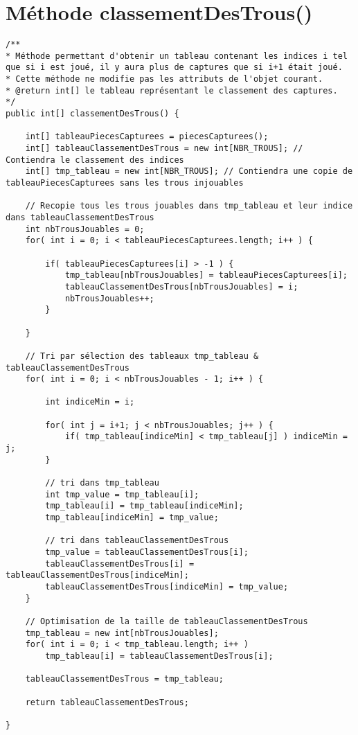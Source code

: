 \documentclass[11pt,a4paper]{report}
\begin{document}
\section{Méthode classementDesTrous()}
\begin{lstlisting}
/**
* Méthode permettant d'obtenir un tableau contenant les indices i tel que si i est joué, il y aura plus de captures que si i+1 était joué.
* Cette méthode ne modifie pas les attributs de l'objet courant.
* @return int[] le tableau représentant le classement des captures.
*/
public int[] classementDesTrous() {

    int[] tableauPiecesCapturees = piecesCapturees();
    int[] tableauClassementDesTrous = new int[NBR_TROUS]; // Contiendra le classement des indices
    int[] tmp_tableau = new int[NBR_TROUS]; // Contiendra une copie de tableauPiecesCapturees sans les trous injouables

    // Recopie tous les trous jouables dans tmp_tableau et leur indice dans tableauClassementDesTrous
    int nbTrousJouables = 0;
    for( int i = 0; i < tableauPiecesCapturees.length; i++ ) {

        if( tableauPiecesCapturees[i] > -1 ) {
            tmp_tableau[nbTrousJouables] = tableauPiecesCapturees[i];
            tableauClassementDesTrous[nbTrousJouables] = i;
            nbTrousJouables++;
        }

    }

    // Tri par sélection des tableaux tmp_tableau & tableauClassementDesTrous
    for( int i = 0; i < nbTrousJouables - 1; i++ ) {

        int indiceMin = i;

        for( int j = i+1; j < nbTrousJouables; j++ ) {
            if( tmp_tableau[indiceMin] < tmp_tableau[j] ) indiceMin = j;
        }

        // tri dans tmp_tableau
        int tmp_value = tmp_tableau[i];
        tmp_tableau[i] = tmp_tableau[indiceMin];
        tmp_tableau[indiceMin] = tmp_value;

        // tri dans tableauClassementDesTrous
        tmp_value = tableauClassementDesTrous[i];
        tableauClassementDesTrous[i] = tableauClassementDesTrous[indiceMin];
        tableauClassementDesTrous[indiceMin] = tmp_value;
    }

    // Optimisation de la taille de tableauClassementDesTrous
    tmp_tableau = new int[nbTrousJouables];
    for( int i = 0; i < tmp_tableau.length; i++ )
        tmp_tableau[i] = tableauClassementDesTrous[i];

    tableauClassementDesTrous = tmp_tableau;

    return tableauClassementDesTrous;

}
\end{lstlisting}
\end{document}
